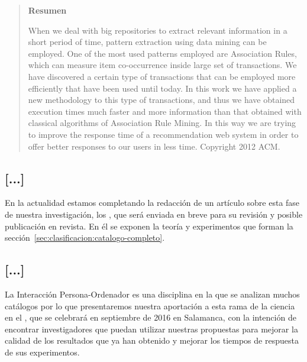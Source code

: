 \begin{quotation}
	\noindent\textbf{Resumen}

	\nopagebreak When we deal with big repositories to extract relevant information in a short period of time, pattern extraction using data mining can be employed. One of the most used patterns employed are Association Rules, which can measure item co-occurrence inside large set of transactions. We have discovered a certain type of transactions that can be employed more efficiently that have been used until today. In this work we have applied a new methodology to this type of transactions, and thus we have obtained execution times much faster and more information than that obtained with classical algorithms of Association Rule Mining. In this way we are trying to improve the response time of a recommendation web system in order to offer better responses to our users in less time. Copyright 2012 ACM.
\end{quotation}








\subsection{[...]}
\label{sec:clasificacion:publicaciones:articulo}
En la actualidad estamos completando la redacción de un artículo sobre esta fase de nuestra investigación, los \CCs, que será enviada en breve para su revisión y posible publicación en revista. En él se exponen la teoría y experimentos que forman la sección~\ref{sec:clasificacion:catalogo-completo}.




\subsection{[...]}
\label{sec:clasificacion:publicaciones:interaccion-2016}
La Interacción Persona-Ordenador es una disciplina en la que se analizan muchos catálogos por lo que presentaremos nuestra aportación a esta rama de la ciencia en el , que se celebrará en septiembre de 2016 en Salamanca, con la intención de encontrar investigadores que puedan utilizar nuestras propuestas para mejorar la calidad de los resultados que ya han obtenido y mejorar los tiempos de respuesta de sus experimentos.

